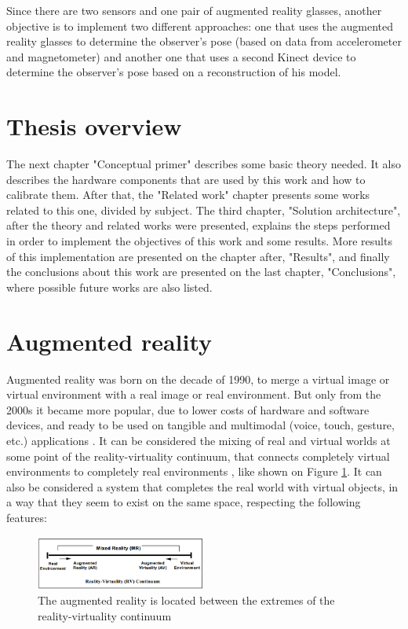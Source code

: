 \documentclass[msc, a4paper, classic, en]{ufbathesis}
\begin{document}
Since there are two sensors and one pair of augmented reality glasses, another objective is to implement two different approaches: one that
uses the augmented reality glasses to determine the observer's pose (based on data from accelerometer and magnetometer) and another one that uses a second Kinect device to determine the observer's pose based on a reconstruction of his model.

\section{Thesis overview}

The next chapter "Conceptual primer" describes some basic theory needed. It also describes the hardware components that are used by this work and how to calibrate them. After that, the "Related work" chapter presents some works related to this one, divided by subject. The third chapter, "Solution architecture", after the theory and related works were presented, explains the steps performed in order to implement the objectives of this work and some results. More results of this implementation are presented on the chapter after, "Results", and finally the conclusions about this work are presented on the last chapter, "Conclusions", where possible future works are also listed.

\section{Augmented reality}

Augmented reality was born on the decade of 1990, to merge a virtual image or virtual environment with a real image or real environment. But only from the 2000s it became more popular, due to lower costs of hardware and software devices, and ready to be used on tangible and multimodal (voice, touch, gesture, etc.) applications \cite{paddle}. It can be considered the mixing of real and virtual worlds at some point of the reality-virtuality continuum, that connects completely virtual environments to completely real environments \cite{milgram94}, like shown on Figure \ref{fig:cont}. It can also be considered a system that completes the real world with virtual objects, in a way that they seem to exist on the same space, respecting the following features:

\begin{figure}
\centering
\includegraphics[width=0.5\textwidth]{images/cont.png}
\caption{The augmented reality is located between the extremes of the reality-virtuality continuum \cite{milgram94}}
\label{fig:cont}
\end{figure}
\end{document}
